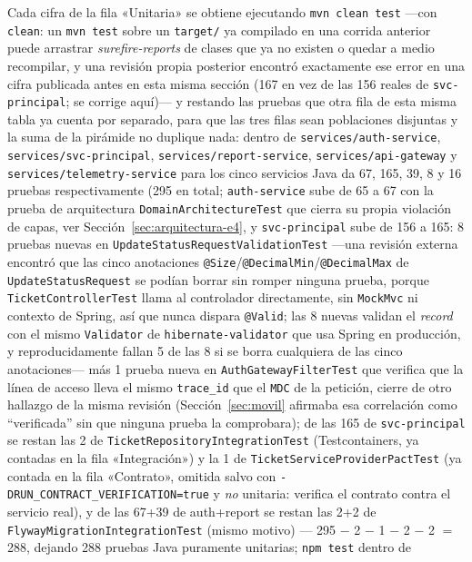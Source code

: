 Cada cifra de la fila «Unitaria» se obtiene ejecutando \texttt{mvn clean test} —con
\texttt{clean}: un \texttt{mvn test} sobre un \texttt{target/} ya compilado en una corrida
anterior puede arrastrar \emph{surefire-reports} de clases que ya no existen o quedar a medio
recompilar, y una revisión propia posterior encontró exactamente ese error en una cifra
publicada antes en esta misma sección (167 en vez de las 156 reales de \texttt{svc-principal};
se corrige aquí)— y restando las pruebas que otra fila de esta misma tabla ya cuenta por
separado, para que las tres filas sean poblaciones disjuntas y la suma de la pirámide no
duplique nada: dentro de \texttt{services/auth-service}, \texttt{services/svc-principal},
\texttt{services/report-service}, \texttt{services/api-gateway} y
\texttt{services/telemetry-service} para los cinco servicios Java da 67, 165, 39, 8 y 16 pruebas
respectivamente (295 en total; \texttt{auth-service} sube de 65 a 67 con la prueba de
arquitectura \texttt{DomainArchitectureTest} que cierra su propia violación de capas, ver
Sección~\ref{sec:arquitectura-e4}, y \texttt{svc-principal} sube de 156 a 165: 8 pruebas nuevas en
\texttt{UpdateStatusRequestValidationTest} —una revisión externa encontró que las cinco
anotaciones \texttt{@Size}/\texttt{@DecimalMin}/\texttt{@DecimalMax} de \texttt{UpdateStatusRequest}
se podían borrar sin romper ninguna prueba, porque \texttt{TicketControllerTest} llama al
controlador directamente, sin \texttt{MockMvc} ni contexto de Spring, así que nunca dispara
\texttt{@Valid}; las 8 nuevas validan el \emph{record} con el mismo \texttt{Validator} de
\texttt{hibernate-validator} que usa Spring en producción, y reproducidamente fallan 5 de las 8 si
se borra cualquiera de las cinco anotaciones— más 1 prueba nueva en
\texttt{AuthGatewayFilterTest} que verifica que la línea de acceso lleva el mismo
\texttt{trace\_id} que el \texttt{MDC} de la petición, cierre de otro hallazgo de la misma
revisión (Sección~\ref{sec:movil} afirmaba esa correlación como ``verificada'' sin que ninguna
prueba la comprobara); de las 165 de \texttt{svc-principal} se restan las 2 de
\texttt{TicketRepositoryIntegrationTest} (Testcontainers, ya contadas en la fila «Integración») y
la 1 de \texttt{TicketServiceProviderPactTest} (ya contada en la fila «Contrato», omitida salvo con
\texttt{-DRUN\_CONTRACT\_VERIFICATION=true} y \emph{no} unitaria: verifica el contrato contra el
servicio real), y de las 67+39 de auth+report se restan las 2+2 de
\texttt{FlywayMigrationIntegrationTest} (mismo motivo) — 295 $-$ 2 $-$ 1 $-$ 2 $-$ 2 $=$
288, dejando 288 pruebas Java puramente unitarias; \texttt{npm test} dentro de
